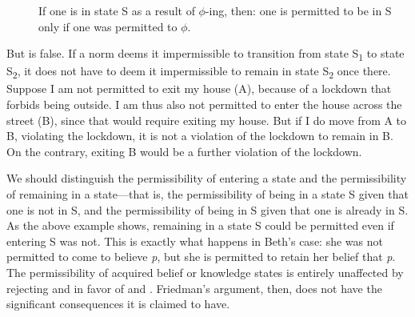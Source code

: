 \documentclass[12pt]{article}
\begin{document}
\begin{description}
    \item[\pp] If one is in state S as a result of $\phi$-ing, then: one is permitted to be in S only if one was permitted to $\phi$.
\end{description}
%
But \pp{} is false. If a norm deems it impermissible to transition from state S\textsubscript{1} to state S\textsubscript{2}, it does not have to deem it impermissible to remain in state S\textsubscript{2} once there. Suppose I am not permitted to exit my house (A), because of a lockdown that forbids being outside. I am thus also not permitted to enter the house across the street (B), since that would require exiting my house. But if I do move from A to B, violating the lockdown, it is not a violation of the lockdown to remain in B. On the contrary, exiting B would be a further violation of the lockdown.

We should distinguish the permissibility of entering a state and the permissibility of remaining in a state---that is, the permissibility of being in a state S given that one is not in S, and the permissibility of being in S given that one is already in S. As the above example shows, remaining in a state S could be permitted even if entering S was not. This is exactly what happens in Beth's case: she was not permitted to come to believe \textit{p}, but she is permitted to retain her belief that \textit{p}. The permissibility of acquired belief or knowledge states is entirely unaffected by rejecting \ep{} and \eo{} in favor of \epc{} and \eoc{}. Friedman's argument, then, does not have the significant consequences it is claimed to have.

\printbibliography
\end{document}
